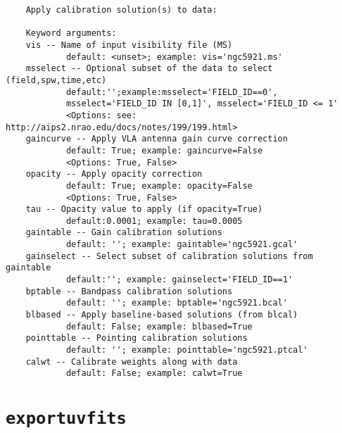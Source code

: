 \small
\begin{verbatim}
    Apply calibration solution(s) to data:
    
    Keyword arguments:
    vis -- Name of input visibility file (MS)
            default: <unset>; example: vis='ngc5921.ms'
    msselect -- Optional subset of the data to select (field,spw,time,etc)
            default:'';example:msselect='FIELD_ID==0', 
            msselect='FIELD_ID IN [0,1]', msselect='FIELD_ID <= 1'
            <Options: see: http://aips2.nrao.edu/docs/notes/199/199.html>
    gaincurve -- Apply VLA antenna gain curve correction
            default: True; example: gaincurve=False
            <Options: True, False>
    opacity -- Apply opacity correction
            default: True; example: opacity=False
            <Options: True, False>
    tau -- Opacity value to apply (if opacity=True)
            default:0.0001; example: tau=0.0005
    gaintable -- Gain calibration solutions
            default: ''; example: gaintable='ngc5921.gcal'
    gainselect -- Select subset of calibration solutions from gaintable
            default:''; example: gainselect='FIELD_ID==1'
    bptable -- Bandpass calibration solutions
            default: ''; example: bptable='ngc5921.bcal'
    blbased -- Apply baseline-based solutions (from blcal)
            default: False; example: blbased=True
    pointtable -- Pointing calibration solutions
            default: ''; example: pointtable='ngc5921.ptcal'
    calwt -- Calibrate weights along with data
            default: False; example: calwt=True
\end{verbatim}
\normalsize


\section{{\tt exportuvfits}}
\label{section:tasks.exportuvfits}

